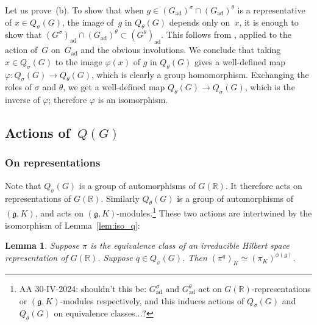 \documentclass[10pt,leqno]{article}
\newtheorem{lemma}[equation]{Lemma}
\newcommand{\ad}{\mathrm{ad}}
\newcommand{\Gad}{G_\mathrm{ad}}
\newcommand{\R}{\mathbb R}
\newcommand{\g}{\mathfrak g}
\begin{document}
Let us prove~(b). To show that when $g\in (\Gad)^\sigma \cap (\Gad)^\theta$ is a representative of $x \in Q_{\sigma}(G)$,  the image of~$g$ in  $Q_\theta(G)$ depends only on~$x$, it is enough to show that  $(G^\sigma)_\ad \cap (\Gad)^\theta \subset (G^\theta)_{\ad}$. This follows from \cite[Proposition 5.4]{galois}, applied to the action of~$G$ on~$\Gad$ and the obvious involutions. We conclude that taking $x \in Q_{\sigma}(G)$ to the image $\varphi(x)$ of $g$ in $Q_{\theta}(G)$ gives a well-defined map $\varphi\colon Q_{\sigma}(G)\to Q_{\theta}(G)$, which is clearly a group homomorphism. Exchanging the roles of $\sigma$ and $\theta$, we get a well-defined map $Q_{\theta}(G) \to Q_{\sigma}(G)$, which is the inverse of $\varphi$; therefore $\varphi$ is an isomorphism.

%


\subsection{Actions of~$Q(G)$}


\subsubsection*{On representations} 



Note that $Q_\sigma(G)$ is a group of automorphisms of $G(\R)$. It therefore acts on representations of $G(\R)$. 
Similarly $Q_\theta(G)$ is a group of automorphisms of $(\g,K)$, and acts on $(\g,K)$-modules.\footnote{AA 30-IV-2024: shouldn't this be:  $\Gad^\sigma$ and $\Gad^\theta$  act on $G(\R)$-representations or $(\g,K)$-modules respectively, and this induces actions of $Q_{\sigma}(G)$ and $Q_{\theta}(G)$ on equivalence classes...?}
These two actions are intertwined by the isomorphism of Lemma~\ref{lem:iso_q}:

\begin{lemma}\label{lem:action_q}
Suppose $\pi$ is the equivalence class of an irreducible Hilbert space representation of $G(\R)$. 
Suppose $q\in Q_\sigma(G)$. 
Then $(\pi^q)_K\simeq (\pi_K)^{\phi(g)}$.
\end{lemma}
\end{document}

